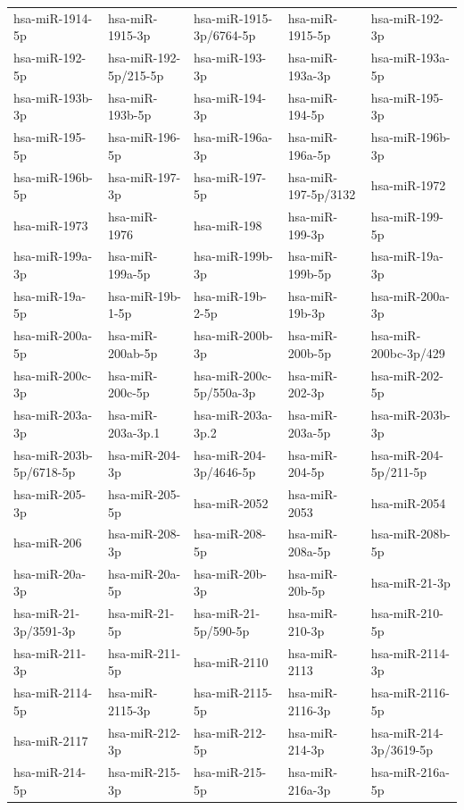 \begin{longtable}{lllll}
hsa-miR-1914-5p & hsa-miR-1915-3p & hsa-miR-1915-3p/6764-5p & hsa-miR-1915-5p & hsa-miR-192-3p \\
hsa-miR-192-5p & hsa-miR-192-5p/215-5p & hsa-miR-193-3p & hsa-miR-193a-3p & hsa-miR-193a-5p \\
hsa-miR-193b-3p & hsa-miR-193b-5p & hsa-miR-194-3p & hsa-miR-194-5p & hsa-miR-195-3p \\
hsa-miR-195-5p & hsa-miR-196-5p & hsa-miR-196a-3p & hsa-miR-196a-5p & hsa-miR-196b-3p \\
hsa-miR-196b-5p & hsa-miR-197-3p & hsa-miR-197-5p & hsa-miR-197-5p/3132 & hsa-miR-1972 \\
hsa-miR-1973 & hsa-miR-1976 & hsa-miR-198 & hsa-miR-199-3p & hsa-miR-199-5p \\
hsa-miR-199a-3p & hsa-miR-199a-5p & hsa-miR-199b-3p & hsa-miR-199b-5p & hsa-miR-19a-3p \\
hsa-miR-19a-5p & hsa-miR-19b-1-5p & hsa-miR-19b-2-5p & hsa-miR-19b-3p & hsa-miR-200a-3p \\
hsa-miR-200a-5p & hsa-miR-200ab-5p & hsa-miR-200b-3p & hsa-miR-200b-5p & hsa-miR-200bc-3p/429 \\
hsa-miR-200c-3p & hsa-miR-200c-5p & hsa-miR-200c-5p/550a-3p & hsa-miR-202-3p & hsa-miR-202-5p \\
hsa-miR-203a-3p & hsa-miR-203a-3p.1 & hsa-miR-203a-3p.2 & hsa-miR-203a-5p & hsa-miR-203b-3p \\
hsa-miR-203b-5p/6718-5p & hsa-miR-204-3p & hsa-miR-204-3p/4646-5p & hsa-miR-204-5p & hsa-miR-204-5p/211-5p \\
hsa-miR-205-3p & hsa-miR-205-5p & hsa-miR-2052 & hsa-miR-2053 & hsa-miR-2054 \\
hsa-miR-206 & hsa-miR-208-3p & hsa-miR-208-5p & hsa-miR-208a-5p & hsa-miR-208b-5p \\
hsa-miR-20a-3p & hsa-miR-20a-5p & hsa-miR-20b-3p & hsa-miR-20b-5p & hsa-miR-21-3p \\
hsa-miR-21-3p/3591-3p & hsa-miR-21-5p & hsa-miR-21-5p/590-5p & hsa-miR-210-3p & hsa-miR-210-5p \\
hsa-miR-211-3p & hsa-miR-211-5p & hsa-miR-2110 & hsa-miR-2113 & hsa-miR-2114-3p \\
hsa-miR-2114-5p & hsa-miR-2115-3p & hsa-miR-2115-5p & hsa-miR-2116-3p & hsa-miR-2116-5p \\
hsa-miR-2117 & hsa-miR-212-3p & hsa-miR-212-5p & hsa-miR-214-3p & hsa-miR-214-3p/3619-5p \\
hsa-miR-214-5p & hsa-miR-215-3p & hsa-miR-215-5p & hsa-miR-216a-3p & hsa-miR-216a-5p \\

\end{longtable}
